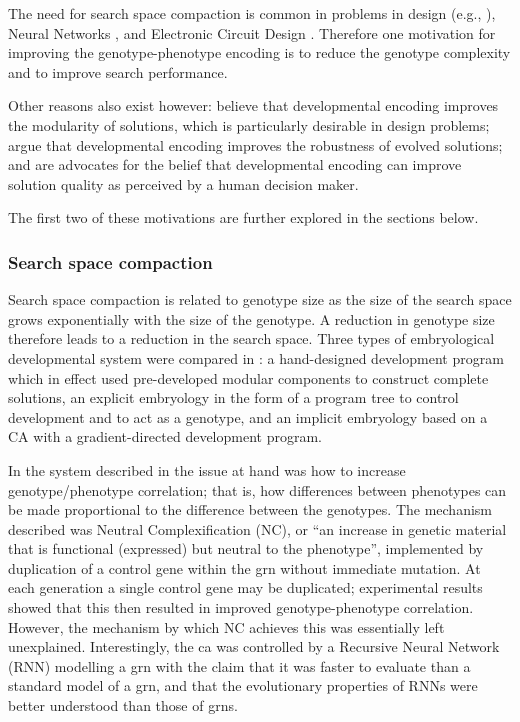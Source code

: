 The need for search space compaction is common in problems in design (e.g., \cite{Benedetti:2006bl,Nicolaou:2009hs,Yang:2009ch}), Neural Networks \parencite{Roy:2009jf}, and Electronic Circuit Design \parencite{Roggen:2007kl,Trefzer:2009qf,Tufte:2006bh,Remortel:2002fk}. Therefore one motivation for improving the genotype-phenotype encoding is to reduce the genotype complexity and to improve search performance.  

Other reasons also exist however: \textcite{Dorica:2007wq,Hornby:2003jt,Hornby:2005rw,Hornby:2006kj} believe that developmental encoding improves the modularity of solutions, which is particularly desirable in design problems; \textcite{Devert:2007wl,Federici:2006pb,Miller:2003qy,Roggen:2007kl,Trefzer:2009qf,Yu:1998hx} argue that developmental encoding improves the robustness of evolved solutions; and \textcite{Hornby:2005rw,Hornby:2006kj,Yang:2009li} are advocates for the belief that developmental encoding can improve solution quality as perceived by a human decision maker. 

The first two of these motivations are further explored in the sections below. 

\subsubsection{Search space compaction}

Search space compaction is related to genotype size as the size of the search space grows exponentially with the size of the genotype. A reduction in genotype size therefore leads to a reduction in the search space. Three types of embryological developmental system were compared in \cite{Bentley:1999zr}: a hand-designed development program which in effect used pre-developed modular components to construct complete solutions, an explicit embryology in the form of a program tree to control development and to act as a genotype, and an implicit embryology based on a CA with a gradient-directed development program. 

In the system described in \cite{Federici:2006pb} the issue at hand was how to increase genotype/phenotype correlation; that is, how differences between phenotypes can be made proportional to the difference between the genotypes. The mechanism described was Neutral Complexification (NC), or ``an increase in genetic material that is functional (expressed) but neutral to the phenotype'', implemented by duplication of a control gene within the \gls{grn} without immediate mutation. At each generation a single control gene may be duplicated; experimental results showed that this then resulted in improved genotype-phenotype correlation. However, the mechanism by which NC achieves this was essentially left unexplained. Interestingly, the \gls{ca} was controlled by a Recursive Neural Network (RNN) modelling a \gls{grn} with the claim that it was faster to evaluate than a standard model of a \gls{grn}, and that the evolutionary properties of RNNs were better understood than those of \glspl{grn}.

